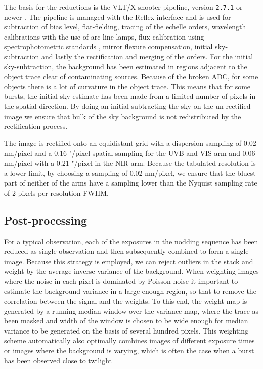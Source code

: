 \documentclass{aa}    %
\begin{document}
The basis for the reductions is the VLT/X-shooter pipeline, version
\texttt{2.7.1} or newer \citep{Goldoni2006, Modigliani2010}. The pipeline is
managed with the Reflex interface \citep{Freudling2013} and is used for
subtraction of bias level, flat-fielding, tracing of the echelle orders,
wavelength calibrations with the use of arc-line lamps, flux calibration using
spectrophotometric standards \citep{Vernet2010, Hamuy1994}, mirror flexure
compensation, initial sky-subtraction and lastly the rectification and merging
of the orders. For the initial sky-subtraction, the background has been
estimated in regions adjacent to the object trace clear of contaminating
sources. Because of the broken ADC, for some objects there is a lot of curvature
in the object trace. This means that for some bursts, the initial sky-estimate
has been made from a limited number of pixels in the spatial direction. By doing
an initial subtracting the sky on the un-rectified image we ensure that bulk of
the sky background is not redistributed by the rectification process.

The image is rectified onto an equidistant grid with a dispersion sampling of
0.02 nm/pixel and a 0.16 "/pixel spatial sampling for the UVB and VIS arm and
0.06 nm/pixel with a 0.21 "/pixel in the NIR arm.  Because the tabulated
resolution is a lower limit, by choosing a sampling of 0.02 nm/pixel, we ensure
that the bluest part of neither of the arms have a sampling lower than the
Nyquist sampling rate of 2 pixels per resolution FWHM.

\subsection{Post-processing} \label{postproc}

For a typical observation, each of the exposures in the nodding sequence has
been reduced as single observation and then subsequently combined to form a
single image. Because this strategy is employed, we can reject outliers in the
stack and weight by the average inverse variance of the background. When
weighting images where the noise in each pixel is dominated by Poisson noise it
important to estimate the background variance in a large enough region, so that
to remove the correlation between the signal and the weights. To this end, the
weight map is generated by a running median window over the variance map, where
the trace as been masked and width of the window is chosen to be wide enough for
median variance to be generated on the basis of several hundred pixels. This
weighting scheme automatically also optimally combines images of different
exposure times or images where the background is varying, which is often the
case when a burst has been observed close to twilight
\end{document}
